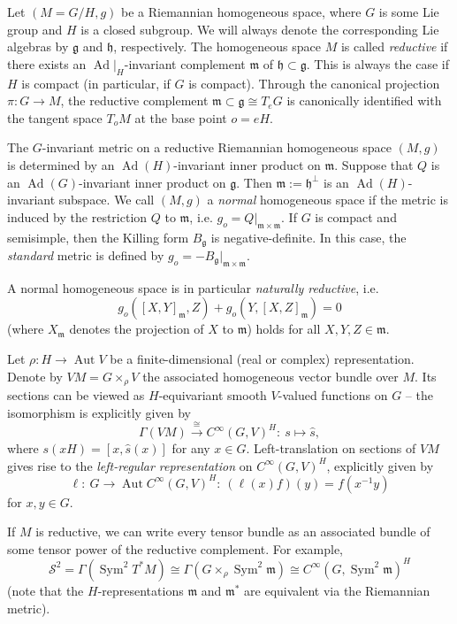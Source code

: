 \documentclass[12pt]{scrartcl}
\theoremstyle{plain}
\theoremstyle{definition}
\newcommand{\Sym}{\operatorname{Sym}}%
\newcommand{\Aut}{\operatorname{Aut}}%
\newcommand{\Ad}{\operatorname{Ad}}%
\renewcommand{\S}{\mathscr{S}}%
\newcommand{\m}{\mathfrak{m}}%
\newcommand{\h}{\mathfrak{h}}%
\newcommand{\g}{\mathfrak{g}}%
\begin{document}
Let $(M=G/H,g)$ be a Riemannian homogeneous space, where $G$ is some Lie group and $H$ is a closed subgroup. We will always denote the corresponding Lie algebras by $\g$ and $\h$, respectively. The homogeneous space $M$ is called \emph{reductive} if there exists an $\Ad\big|_H$-invariant complement $\m$ of $\h\subset\g$. This is always the case if $H$ is compact (in particular, if $G$ is compact). Through the canonical projection $\pi: G\to M$, the reductive complement $\m\subset\g\cong T_eG$ is canonically identified with the tangent space $T_oM$ at the base point $o=eH$.

The $G$-invariant metric on a reductive Riemannian homogeneous space $(M,g)$ is determined by an $\Ad(H)$-invariant inner product on $\m$. Suppose that $Q$ is an $\Ad(G)$-invariant inner product on $\g$. Then $\m:=\h^\perp$ is an $\Ad(H)$-invariant subspace. We call $(M,g)$ a \emph{normal} homogeneous space if the metric is induced by the restriction $Q$ to $\m$, i.e. $g_o=Q\big|_{\m\times\m}$. If $G$ is compact and semisimple, then the Killing form $B_\g$ is negative-definite. In this case, the \emph{standard} metric is defined by $g_o=-B_\g\big|_{\m\times\m}$.

A normal homogeneous space is in particular \emph{naturally reductive}, i.e.
\[g_o([X,Y]_\m,Z)+g_o(Y,[X,Z]_\m)=0\]
(where $X_\m$ denotes the projection of $X$ to $\m$) holds for all $X,Y,Z\in\m$.

Let $\rho: H\to\Aut V$ be a finite-dimensional (real or complex) representation. Denote by $VM=G\times_\rho V$ the associated homogeneous vector bundle over $M$. Its sections can be viewed as $H$-equivariant smooth $V$-valued functions on $G$ -- the isomorphism is explicitly given by
\[\Gamma(VM)\stackrel{\cong}{\longrightarrow} C^\infty(G,V)^H:\ s\mapsto\hat s,\]
where $s(xH)=[x,\hat s(x)]$ for any $x\in G$. Left-translation on sections of $VM$ gives rise to the \emph{left-regular representation} on $C^\infty(G,V)^H$, explicitly given by
\[\ell:\ G\to\Aut C^\infty(G,V)^H:\ (\ell(x)f)(y)=f(x^{-1}y)\]
for $x,y\in G$.

If $M$ is reductive, we can write every tensor bundle as an associated bundle of some tensor power of the reductive complement. For example,
\[\S^2=\Gamma(\Sym^2T^\ast M)\cong\Gamma(G\times_\rho\Sym^2\m)\cong C^\infty(G,\Sym^2\m)^H\]
(note that the $H$-representations $\m$ and $\m^\ast$ are equivalent via the Riemannian metric).
\end{document}
